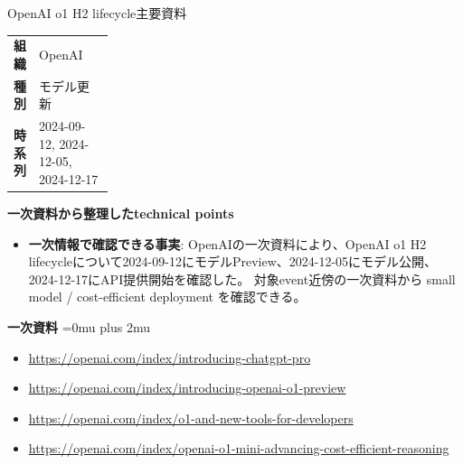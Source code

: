\begin{technicalnote}{OpenAI o1 H2 lifecycle}{主要資料}
\begingroup
\begin{tabularx}{\linewidth}{@{}>{\bfseries}p{0.22\linewidth}X@{}}
組織 & OpenAI \\
種別 & モデル更新 \\
時系列 & 2024-09-12, 2024-12-05, 2024-12-17 \\
\end{tabularx}
\smallskip
{\bfseries 一次資料から整理したtechnical points}
\begin{itemize}[leftmargin=1.5em,itemsep=0.35em]
\item \textbf{一次情報で確認できる事実}: OpenAIの一次資料により、OpenAI o1 H2 lifecycleについて2024-09-12にモデルPreview、2024-12-05にモデル公開、2024-12-17にAPI提供開始を確認した。 対象event近傍の一次資料から small model / cost-efficient deployment を確認できる。
\end{itemize}
\begin{minipage}{\linewidth}
\begin{samepage}
{\bfseries 一次資料}
\begingroup\sloppy
\Urlmuskip=0mu plus 2mu\relax
\begin{itemize}[leftmargin=1.5em,itemsep=0.25em]
\item {\scriptsize\url{https://openai.com/index/introducing-chatgpt-pro}}
\item {\scriptsize\url{https://openai.com/index/introducing-openai-o1-preview}}
\item {\scriptsize\url{https://openai.com/index/o1-and-new-tools-for-developers}}
\item {\scriptsize\url{https://openai.com/index/openai-o1-mini-advancing-cost-efficient-reasoning}}
\end{itemize}
\endgroup
\end{samepage}
\end{minipage}
\endgroup
\end{technicalnote}
\medskip

